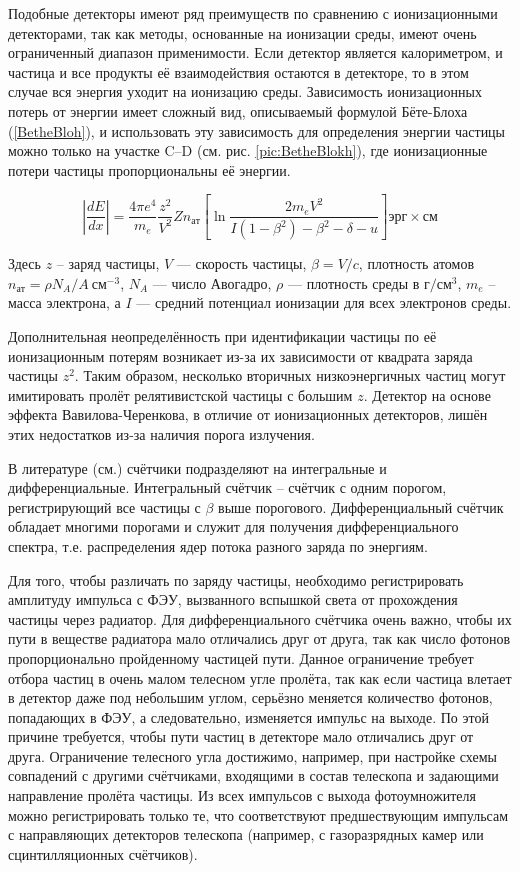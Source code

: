 \documentclass[12pt,a4paper]{report} %
\begin{document}
Подобные детекторы имеют ряд преимуществ по сравнению с ионизационными детекторами, так как методы, основанные на ионизации среды, имеют очень ограниченный диапазон применимости. Если детектор является калориметром, и частица и все продукты её взаимодействия остаются в детекторе, то в этом случае вся энергия уходит на ионизацию среды. Зависимость ионизационных потерь от энергии имеет сложный вид, описываемый формулой Бёте-Блоха (\ref{BetheBloh}), и использовать эту зависимость для определения энергии частицы можно только на участке C--D (см. рис. \ref{pic:BetheBlokh}), где ионизационные потери частицы пропорциональны её энергии.

\begin{equation}\label{BetheBloh}
\left| \frac{dE}{dx}\right| = \frac{4\pi e^4}{m_e}\frac{z^2}{V^2}Zn_{ат}
\left[
	\ln \frac{2m_eV^2}{I(1-\beta^2)-\beta^2-\delta-u} 
\right] эрг\times см
\end{equation}

Здесь $z$ -- заряд частицы, $V$ --- скорость частицы, $\beta = V / c$, плотность атомов $n_{ат}=\rho N_A/A~см^{-3}$, $N_A$ --- число Авогадро, $\rho$ --- плотность среды в $г/см^3$, $m_e$ -- масса электрона, а $I$ --- средний потенциал ионизации для всех электронов среды. 

Дополнительная неопределённость при идентификации частицы по её ионизационным потерям возникает из-за их зависимости от квадрата заряда частицы $z^2$. Таким образом, несколько вторичных низкоэнергичных частиц могут имитировать пролёт релятивистской частицы с большим $z$. Детектор на основе эффекта Вавилова-Черенкова, в отличие от ионизационных детекторов, лишён этих недостатков из-за наличия порога излучения. 

В литературе (см.\cite{Ginzburg}) счётчики подразделяют на интегральные и дифференциальные. Интегральный счётчик -- счётчик с одним порогом, регистрирующий все частицы с $\beta$ выше порогового. Дифференциальный счётчик обладает многими порогами и служит для получения дифференциального спектра, т.е. распределения ядер потока разного заряда по энергиям.

Для того, чтобы различать по заряду частицы, необходимо регистрировать амплитуду импульса с ФЭУ, вызванного вспышкой света от прохождения частицы через радиатор. 
Для дифференциального счётчика очень важно, чтобы их пути в веществе радиатора мало отличались друг от друга, так как число фотонов пропорционально пройденному частицей пути. 
Данное ограничение требует отбора частиц в очень малом телесном угле пролёта, так как если частица влетает в детектор даже под небольшим углом, серьёзно меняется количество фотонов, попадающих в ФЭУ, а следовательно, изменяется импульс на выходе. 
По этой причине требуется, чтобы пути частиц в детекторе мало отличались друг от друга.
Ограничение телесного угла достижимо, например, при настройке схемы совпадений с другими счётчиками, входящими в состав телескопа и задающими направление пролёта частицы.
Из всех импульсов с выхода фотоумножителя можно регистрировать только те, что соответствуют предшествующим импульсам с направляющих детекторов телескопа (например, с газоразрядных камер или сцинтилляционных счётчиков).
\end{document}

